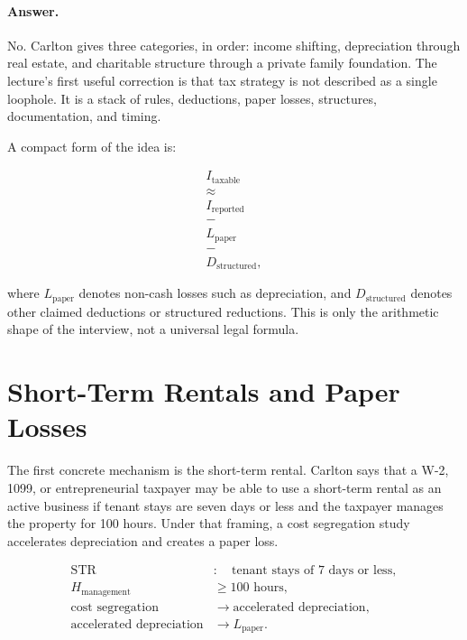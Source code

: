 \documentclass[11pt,oneside]{book}
\begin{document}
\paragraph{Answer.}
No. Carlton gives three categories, in order: income shifting, depreciation through real estate, and charitable structure through a private family foundation. The lecture's first useful correction is that tax strategy is not described as a single loophole. It is a stack of rules, deductions, paper losses, structures, documentation, and timing.

A compact form of the idea is:

\begin{equation}
\begin{gathered}
I_{\mathrm{taxable}}\\
\approx\\
I_{\mathrm{reported}}\\
-\\
L_{\mathrm{paper}}\\
-\\
D_{\mathrm{structured}},
\end{gathered}
\end{equation}

where \(L_{\mathrm{paper}}\) denotes non-cash losses such as depreciation, and \(D_{\mathrm{structured}}\) denotes other claimed deductions or structured reductions. This is only the arithmetic shape of the interview, not a universal legal formula.

\section{Short-Term Rentals and Paper Losses}

The first concrete mechanism is the short-term rental. Carlton says that a W-2, 1099, or entrepreneurial taxpayer may be able to use a short-term rental as an active business if tenant stays are seven days or less and the taxpayer manages the property for 100 hours. Under that framing, a cost segregation study accelerates depreciation and creates a paper loss.

\begin{align}
\mathrm{STR} &:\quad \text{tenant stays of }7\text{ days or less},\\
H_{\mathrm{management}} &\geq 100\text{ hours},\\
\text{cost segregation} &\longrightarrow \text{accelerated depreciation},\\
\text{accelerated depreciation} &\longrightarrow L_{\mathrm{paper}}.
\end{align}
\end{document}
